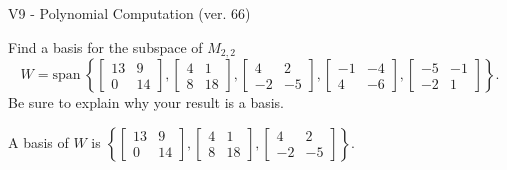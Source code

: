 \begin{exercise}
  \begin{exerciseTitle}V9 - Polynomial Computation (ver. 66)\end{exerciseTitle}
  \begin{exerciseStatement}
    Find a basis for the subspace of \(M_{2,2}\) 
\[W=\mathrm{span}\ \left\{\left[\begin{array}{cc}
13 & 9 \\
0 & 14
\end{array}\right] , \left[\begin{array}{cc}
4 & 1 \\
8 & 18
\end{array}\right] , \left[\begin{array}{cc}
4 & 2 \\
-2 & -5
\end{array}\right] , \left[\begin{array}{cc}
-1 & -4 \\
4 & -6
\end{array}\right] , \left[\begin{array}{cc}
-5 & -1 \\
-2 & 1
\end{array}\right]\right\}.\]
 Be sure to explain why your result is a basis.


  \end{exerciseStatement}
  \begin{exerciseAnswer}
   A basis of \(W\) is  \(\left\{\left[\begin{array}{cc}
13 & 9 \\
0 & 14
\end{array}\right] , \left[\begin{array}{cc}
4 & 1 \\
8 & 18
\end{array}\right] , \left[\begin{array}{cc}
4 & 2 \\
-2 & -5
\end{array}\right]\right\}\).
  


  \end{exerciseAnswer}
\end{exercise}